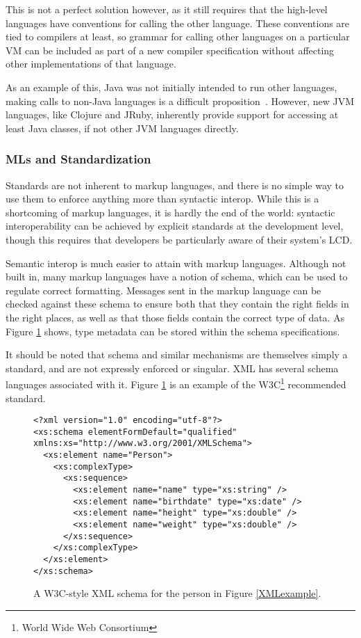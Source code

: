 \documentclass{sig-alternate}
\begin{document}
This is not a perfect solution however, as it still requires that the high-level languages have conventions for calling the other language. 
These conventions are tied to compilers at least, so grammar for calling other languages on a particular VM can be included as part of a new compiler specification without affecting other implementations of that language.

As an example of this, Java was not initially intended to run other languages, making calls to non-Java languages is a difficult proposition~\cite{Chisnall:2013}. However, new JVM languages, like Clojure and JRuby, inherently provide support for accessing at least Java classes, if not other JVM languages directly.


\subsubsection*{MLs and Standardization}
Standards are not inherent to markup languages, and there is no simple way to use them to enforce anything more than syntactic interop. While this is a shortcoming of markup languages, it is hardly the end of the world: syntactic interoperability can be achieved by explicit standards at the development level, though this requires that developers be particularly aware of their system's LCD.

Semantic interop is much easier to attain with markup languages. Although not built in, many markup languages have a notion of schema, which can be used to regulate correct formatting. Messages sent in the markup language can be checked against these schema to ensure both that they contain the right fields in the right places, as well as that those fields contain the correct type of data. As Figure \ref{XMLschema} shows, type metadata can be stored within the schema specifications.

It should be noted that schema and similar mechanisms are themselves simply a standard, and are not expressly enforced or singular. XML has several schema languages associated with it. Figure \ref{XMLschema} is an example of the W3C\footnote{World Wide Web Consortium} recommended standard.


\begin{figure}
\begin{verbatim}
<?xml version="1.0" encoding="utf-8"?>
<xs:schema elementFormDefault="qualified" xmlns:xs="http://www.w3.org/2001/XMLSchema">
  <xs:element name="Person">
    <xs:complexType>
      <xs:sequence>
        <xs:element name="name" type="xs:string" />
        <xs:element name="birthdate" type="xs:date" />
        <xs:element name="height" type="xs:double" />
        <xs:element name="weight" type="xs:double" />
      </xs:sequence>
    </xs:complexType>
  </xs:element>
</xs:schema>
\end{verbatim}
\caption{A W3C-style XML schema for the person in Figure \ref{XMLexample}.}
\label{XMLschema}
\end{figure}
\end{document}
